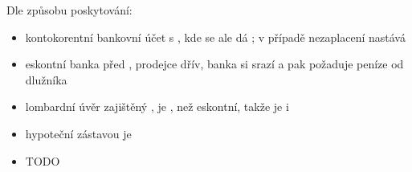 \documentclass[ekobook.tex]{subfiles}
\begin{document}
{\begin{wnumbered}
Dle způsobu poskytování:
\begin{itemize}[label=\textcolor{WPP}{$\hookrightarrow$}]
\item kontokorentní \texthl{$\rightarrow$} bankovní účet s , kde se ale dá ; v případě nezaplacení nastává 
\item eskontní \texthl{$\rightarrow$} banka  před , prodejce  dřív, banka si srazí  a pak požaduje peníze od dlužníka
\item lombardní \texthl{$\rightarrow$} úvěr zajištěný , je , než eskontní, takže je i 
\item hypoteční \texthl{$\rightarrow$} zástavou je 
\end{itemize}
\item {}
\begin{itemize}[label=\textcolor{WPP}{$\hookrightarrow$}]
\item TODO
\end{itemize}
\end{wnumbered}
}
\wbreak
\end{document}

